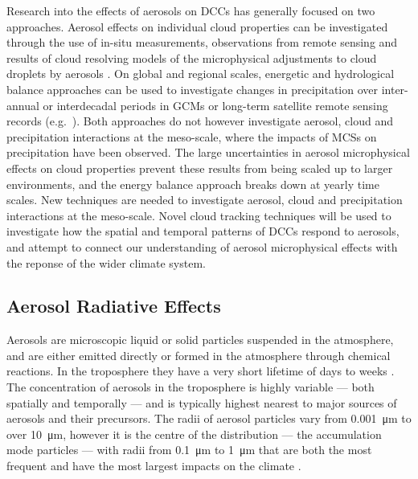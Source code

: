 Research into the effects of aerosols on DCCs has generally focused on two approaches. Aerosol effects on individual cloud properties can be investigated through the use of in-situ measurements, observations from remote sensing and results of cloud resolving models of the microphysical adjustments to cloud droplets by aerosols \citep{khain2005aerosol}. 
On global and regional scales, energetic and hydrological balance approaches can be used to investigate changes in precipitation over inter-annual or interdecadal periods in GCMs or long-term satellite remote sensing records (e.g.\ \citet{allen_constraints_2002, held_robust_2006, muller_energetic_2011, richardson_drivers_2018}). 
Both approaches do not however investigate aerosol, cloud and precipitation interactions at the meso-scale, where the impacts of MCSs on precipitation have been observed. 
The large uncertainties in aerosol microphysical effects on cloud properties prevent these results from being scaled up to larger environments, and the energy balance approach breaks down at yearly time scales. 
New techniques are needed to investigate aerosol, cloud and precipitation interactions at the meso-scale. 
Novel cloud tracking techniques will be used to investigate how the spatial and temporal patterns of DCCs respond to aerosols, and attempt to connect our understanding of aerosol microphysical effects with the reponse of the wider climate system.

\subsection{Aerosol Radiative Effects}

Aerosols are microscopic liquid or solid particles suspended in the atmosphere, and are either emitted directly or formed in the atmosphere through chemical reactions.
In the troposphere they have a very short lifetime of days to weeks \citep{IPCCCloudsAeorosolsBoucher2013}.
The concentration of aerosols in the troposphere is highly variable --- both spatially and temporally --- and is typically highest nearest to major sources of aerosols and their precursors.
The radii of aerosol particles vary from \SI{0.001}{\micro\meter} to over \SI{10}{\micro\meter}, however it is the centre of the distribution --- the accumulation mode particles --- with radii from \SI{0.1}{\micro\meter} to \SI{1}{\micro\meter} that are both the most frequent and have the most largest impacts on the climate \citep{acci}.

